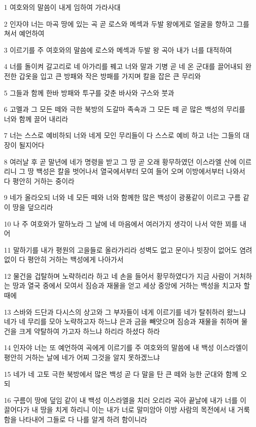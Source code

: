 \par 1 여호와의 말씀이 내게 임하여 가라사대
\par 2 인자야 너는 마곡 땅에 있는 곡 곧 로스와 메섹과 두발 왕에게로 얼굴을 향하고 그를 쳐서 예언하여
\par 3 이르기를 주 여호와의 말씀에 로스와 메섹과 두발 왕 곡아 내가 너를 대적하여
\par 4 너를 돌이켜 갈고리로 네 아가리를 꿰고 너와 말과 기병 곧 네 온 군대를 끌어내되 완전한 갑옷을 입고 큰 방패와 작은 방패를 가지며 칼을 잡은 큰 무리와
\par 5 그들과 함께 한바 방패와 투구를 갖춘 바사와 구스와 붓과
\par 6 고멜과 그 모든 떼와 극한 북방의 도갈마 족속과 그 모든 떼 곧 많은 백성의 무리를 너와 함께 끌어 내리라
\par 7 너는 스스로 예비하되 너와 네게 모인 무리들이 다 스스로 예비 하고 너는 그들의 대장이 될지어다
\par 8 여러날 후 곧 말년에 네가 명령을 받고 그 땅 곧 오래 황무하였던 이스라엘 산에 이르리니 그 땅 백성은 칼을 벗어나서 열국에서부터 모여 들어 오며 이방에서부터 나와서 다 평안히 거하는 중이라
\par 9 네가 올라오되 너와 네 모든 떼와 너와 함께한 많은 백성이 광풍같이 이르고 구름 같이 땅을 덮으리라
\par 10 나 주 여호와가 말하노라 그 날에 네 마음에서 여러가지 생각이 나서 악한 꾀를 내어
\par 11 말하기를 내가 평원의 고을들로 올라가리라 성벽도 없고 문이나 빗장이 없어도 염려없이 다 평안히 거하는 백성에게 나아가서
\par 12 물건을 겁탈하며 노략하리라 하고 네 손을 들어서 황무하였다가 지금 사람이 거처하는 땅과 열국 중에서 모여서 짐승과 재물을 얻고 세상 중앙에 거하는 백성을 치고자 할 때에
\par 13 스바와 드단과 다시스의 상고와 그 부자들이 네게 이르기를 네가 탈취하러 왔느냐 네가 네 무리를 모아 노략하고자 하느냐 은과 금을 빼앗으며 짐승과 재물을 취하며 물건을 크게 약탈하여 가고자 하느냐 하리라 하셨다 하라
\par 14 인자야 너는 또 예언하여 곡에게 이르기를 주 여호와의 말씀에 내 백성 이스라엘이 평안히 거하는 날에 네가 어찌 그것을 알지 못하겠느냐
\par 15 네가 네 고토 극한 북방에서 많은 백성 곧 다 말을 탄 큰 떼와 능한 군대와 함께 오되
\par 16 구름이 땅에 덮임 같이 내 백성 이스라엘을 치러 오리라 곡아 끝날에 내가 너를 이끌어다가 내 땅을 치게 하리니 이는 내가 너로 말미암아 이방 사람의 목전에서 내 거룩함을 나타내어 그들로 다 나를 알게 하려 함이니라
